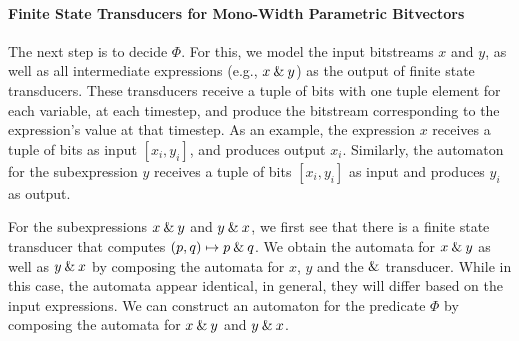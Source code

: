 \paragraph{Finite State Transducers for Mono-Width Parametric Bitvectors}

The next step is to decide $\Phi$.
For this, we model the input bitstreams $x$ and $y$, as well as all intermediate expressions
(e.g., $x \mathbin{\&} y$) as the output of finite state transducers.
These transducers receive a tuple of bits with one tuple element for each variable, at each timestep,
and produce the bitstream corresponding to the expression's value at that timestep.
As an example, the expression $x$ receives a tuple of bits as input $[x_i, y_i]$, and produces output $x_i$.
Similarly, the automaton for the subexpression $y$ receives a tuple of bits $[x_i, y_i]$ as input and produces $y_i$ as output.

For the subexpressions $x \mathbin{\&} y$ and $y \mathbin{\&} x$,
we first see that there is a finite state transducer that computes $(p, q)\mapsto p \mathbin{\&} q$.
We obtain the automata for $x \mathbin{\&} y$ as well as $y \mathbin{\&} x$ by composing the automata for $x$, $y$ and the $\mathbin{\&}$ transducer.
While in this case, the automata appear identical, in general, they will differ based on the input expressions.
We can construct an automaton for the predicate $\Phi$ by composing the automata for $x \mathbin{\&} y$ and $y \mathbin{\&} x$.



